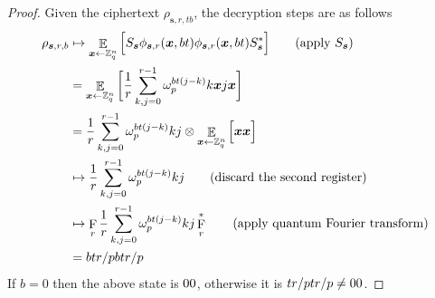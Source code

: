 \documentclass[11pt]{article}
\theoremstyle{plain}
\theoremstyle{definition}
\DeclareMathOperator{\qft}{F}
\DeclareMathOperator{\E}{\mathbb{E}}
\let\ket\relax
\DeclarePairedDelimiter{\ket}{\lvert}{\rangle}
\let\bra\relax
\DeclarePairedDelimiter{\bra}{\langle}{\rvert}
\def\Z{\mathbb{Z}}
\begin{document}
\begin{proof}
    Given the ciphertext $\rho_{\bm{s}, r, tb}$, the decryption steps are as follows
    \begin{align*}
        \rho_{\bm{s}, r, b}
        & \mapsto \E_{\bm{x} \leftarrow \Z_q^n} \Big[ S_{\bm{s}} \ket{\phi_{\bm{s}, r}(\bm{x}, bt)} \bra{\phi_{\bm{s}, r}(\bm{x}, bt)} S_{\bm{s}}^* \Big]  \tag{apply $S_{\bm{s}}$} \\
        & = \E_{\bm{x} \leftarrow \Z_q^n} \bigg[ \frac{1}{r} \sum_{k, j = 0}^{r - 1} \omega_p^{bt(j - k)}\ket{k}\ket{\bm{x}} \bra{j}\bra{\bm{x}} \bigg] \\
        & = \frac{1}{r} \sum_{k, j = 0}^{r - 1} \omega_p^{bt(j - k)}\ket{k}\bra{j} \otimes \E_{\bm{x} \leftarrow \Z_q^n} \Big[ \ket{\bm{x}}\bra{\bm{x}} \Big] \\
        & \mapsto \frac{1}{r} \sum_{k, j = 0}^{r - 1} \omega_p^{bt(j - k)}\ket{k}\bra{j} \tag{discard the second register} \\
        & \mapsto \qft_r \frac{1}{r} \sum_{k, j = 0}^{r - 1} \omega_p^{bt(j - k)}\ket{k}\bra{j} \qft_r^* \tag{apply quantum Fourier transform}\\
        & = \ket{btr/p} \bra{btr/p}
    \end{align*}
    If $b = 0$ then the above state is $\ket{0}\bra{0}$, otherwise it is $\ket{tr / p}\bra{tr / p} \ne \ket{0}\bra{0}$. 
\end{proof}
\end{document}
